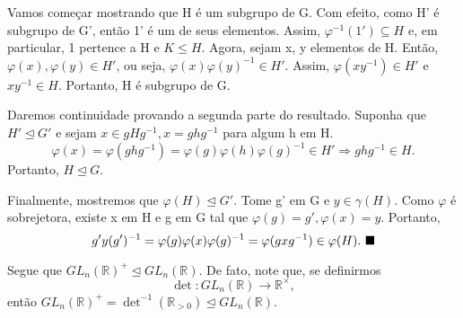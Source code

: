 \documentclass[algebra_notes.tex]{subfiles}
\begin{document}
\begin{proof*}
	Vamos começar mostrando que H é um subgrupo de G. Com efeito, como H' é subgrupo de G', então 1' é um de seus elementos.
	Assim, $\varphi^{-1}(1')\subseteq{H}$ e, em particular, 1 pertence a H e $K\leq{H}.$ Agora, sejam x, y elementos de H. Então,
	$\varphi(x), \varphi(y)\in H'$, ou seja, $\varphi(x)\varphi(y)^{-1}\in H'$. Assim, $\varphi(xy^{-1})\in H'$ e $xy^{-1}\in H.$
	Portanto, H é subgrupo de G.

	Daremos continuidade provando a segunda parte do resultado. Suponha que $H'\trianglelefteq{G'}$ e sejam $x\in gHg^{-1}, x = ghg^{-1}$
	para algum h em H.
	$$
		\varphi(x) = \varphi(ghg^{-1}) = \varphi(g)\varphi(h)\varphi(g)^{-1}\in H' \Rightarrow ghg^{-1}\in H.
	$$
	Portanto, $H\trianglelefteq{G}.$

	Finalmente, mostremos que $\varphi(H)\trianglelefteq{G'}.$ Tome g' em G e $y\in\gamma(H).$ Como $\varphi$ é sobrejetora, existe
	x em H e g em G tal que $\varphi(g)=g', \varphi(x) = y.$ Portanto,
	$$
		g'y(g')^{-1} = \varphi(g)\varphi(x)\varphi(g)^{-1} = \varphi(gxg^{-1})\in \varphi(H).\text{ $\blacksquare$}
	$$
\end{proof*}
\begin{example*}
	Segue que $GL_{n}(\mathbb{R})^{+}\trianglelefteq{GL_{n}(\mathbb{R})}$. De fato, note que, se definirmos
	$$
		\det:GL_{n}(\mathbb{R})\rightarrow \mathbb{R}^{\times},
	$$
	então $GL_{n}(\mathbb{R})^{+} = \det^{-1}(\mathbb{R}_{>0})\trianglelefteq{GL_{n}(\mathbb{R})}$. \qedsymbol
\end{example*}
\end{document}
